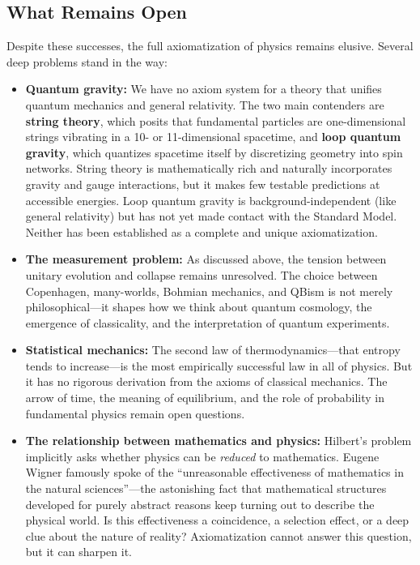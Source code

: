 \subsection{What Remains Open}

Despite these successes, the full axiomatization of physics remains elusive. Several deep problems stand in the way:

\begin{itemize}
    \item \textbf{Quantum gravity:} We have no axiom system for a theory that unifies quantum mechanics and general relativity. The two main contenders are \textbf{string theory}, which posits that fundamental particles are one-dimensional strings vibrating in a 10- or 11-dimensional spacetime, and \textbf{loop quantum gravity}, which quantizes spacetime itself by discretizing geometry into spin networks. String theory is mathematically rich and naturally incorporates gravity and gauge interactions, but it makes few testable predictions at accessible energies. Loop quantum gravity is background-independent (like general relativity) but has not yet made contact with the Standard Model. Neither has been established as a complete and unique axiomatization.

    \item \textbf{The measurement problem:} As discussed above, the tension between unitary evolution and collapse remains unresolved. The choice between Copenhagen, many-worlds, Bohmian mechanics, and QBism is not merely philosophical---it shapes how we think about quantum cosmology, the emergence of classicality, and the interpretation of quantum experiments.

    \item \textbf{Statistical mechanics:} The second law of thermodynamics---that entropy tends to increase---is the most empirically successful law in all of physics. But it has no rigorous derivation from the axioms of classical mechanics. The arrow of time, the meaning of equilibrium, and the role of probability in fundamental physics remain open questions.

    \item \textbf{The relationship between mathematics and physics:} Hilbert's problem implicitly asks whether physics can be \emph{reduced} to mathematics. Eugene Wigner famously spoke of the ``unreasonable effectiveness of mathematics in the natural sciences''---the astonishing fact that mathematical structures developed for purely abstract reasons keep turning out to describe the physical world. Is this effectiveness a coincidence, a selection effect, or a deep clue about the nature of reality? Axiomatization cannot answer this question, but it can sharpen it.
\end{itemize}

